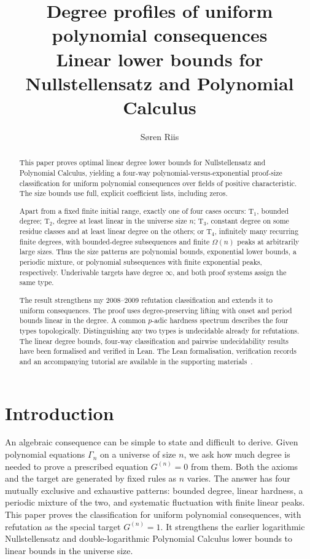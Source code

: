 \documentclass[11pt,a4paper]{article}
\title{Degree profiles of uniform polynomial consequences\\[3pt]
\large Linear lower bounds for Nullstellensatz and Polynomial Calculus}
\author{S\o ren Riis}
\date{}
\theoremstyle{definition}\newtheorem{definition}[theorem]{Definition}
\theoremstyle{remark}\newtheorem{remark}[theorem]{Remark}
\begin{document}
\maketitle
\begin{abstract}
This paper proves optimal linear degree lower bounds for Nullstellensatz
and Polynomial Calculus, yielding a four-way polynomial-versus-exponential
proof-size classification for uniform polynomial consequences over fields
of positive characteristic. The size bounds use full, explicit
coefficient lists, including zeros.

Apart from a fixed finite initial range, exactly one of four cases
occurs: $\mathrm T_1$, bounded degree; $\mathrm T_2$, degree at least
linear in the universe size $n$; $\mathrm T_3$, constant degree on some
residue classes and at least linear degree on the others; or
$\mathrm T_4$, infinitely many recurring finite degrees, with
bounded-degree subsequences and finite $\Omega(n)$ peaks at arbitrarily
large sizes. Thus the size patterns are polynomial bounds, exponential
lower bounds, a periodic mixture, or polynomial subsequences with finite
exponential peaks, respectively. Underivable targets have degree
$\infty$, and both proof systems assign the same type.

The result strengthens my 2008--2009 refutation classification and extends
it to uniform consequences. The proof uses degree-preserving lifting
with onset and period bounds linear in the degree. A common $p$-adic
hardness spectrum describes the four types topologically. Distinguishing
any two types is undecidable already for refutations. The linear degree bounds, four-way classification and pairwise
undecidability results have been formalised and verified in Lean. The Lean
formalisation, verification records and an accompanying tutorial are
available in the supporting materials~\cite{RiisSupporting}.
\end{abstract}
\medskip
\section{Introduction}\label{sec:introduction}
An algebraic consequence can be simple to state and difficult to derive.
Given polynomial equations $\Gamma_n$ on a universe of size $n$, we ask
how much degree is needed to prove a prescribed equation $G^{(n)}=0$ from
them. Both the axioms and the target are generated by fixed rules as
$n$ varies. The answer has four mutually exclusive and exhaustive
patterns: bounded degree, linear hardness, a periodic mixture of the
two, and systematic fluctuation with finite linear peaks. This paper
proves the classification for uniform polynomial consequences, with
refutation as the special target $G^{(n)}=1$. It strengthens the earlier
logarithmic Nullstellensatz and double-logarithmic Polynomial Calculus
lower bounds to linear bounds in the universe size.
\end{document}
